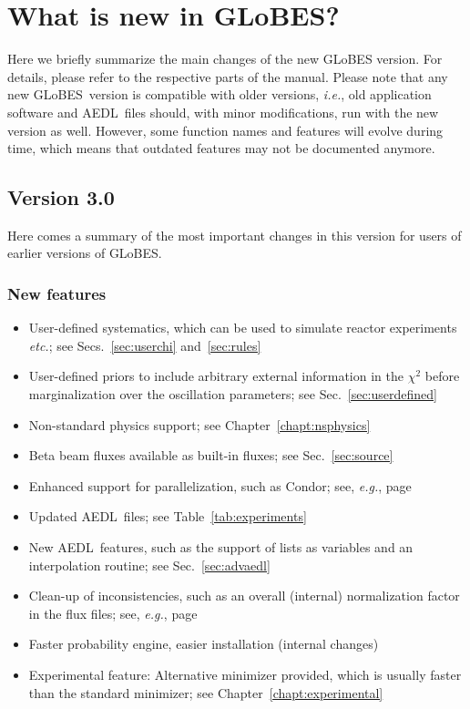 \documentclass[a4paper,12pt,twoside]{book}
\newcommand{\ie}{{\it i.e.}}
\newcommand{\eg}{{\it e.g.}}
\newcommand{\etc}{{\it etc.}}
\newcommand{\Sec}{Sec.}
\newcommand{\Secs}{Secs.}
\newcommand{\Chapt}{Chapter}
\newcommand{\Tab}{Table}
\newcommand{\GLOBES}{{\sf GLoBES}}
\newcommand{\AEDL}{{\sf AEDL}}
\begin{document}
\chapter*{What is new in \GLOBES ?}

Here we briefly summarize the main changes of the new GLoBES version. For details, please
refer to the respective parts of the manual. Please note that any new \GLOBES\ version is
compatible with older versions, \ie, old application software and \AEDL\ files should, with minor
modifications, run with the new version as well.  However, some function names and features will
evolve during time, which means that outdated features may not be documented anymore.

\section*{Version 3.0}

Here comes a summary of the most important changes in this version for users of earlier
versions of \GLOBES .

\subsection*{New features}

\begin{itemize}
 \item
  User-defined systematics, which can be used to simulate reactor experiments \etc ; see \Secs~\ref{sec:userchi}
and~\ref{sec:rules}
 \item
  User-defined priors to include arbitrary external information in the $\chi^2$ before
marginalization over the oscillation parameters; see \Sec~\ref{sec:userdefined} 
\item
  Non-standard physics support; see \Chapt~\ref{chapt:nsphysics}
\item
  Beta beam fluxes available as built-in fluxes; see \Sec~\ref{sec:source}
\item
  Enhanced support for parallelization, such as Condor; see, \eg, page~\pageref{sec:condor}
\item
  Updated \AEDL\ files; see \Tab~\ref{tab:experiments}
\item
 New \AEDL\ features, such as the support of lists as variables and an interpolation
routine; see \Sec~\ref{sec:advaedl}
\item
 Clean-up of inconsistencies, such as an overall (internal) normalization factor in the flux files;
see, \eg, page~\pageref{app:flux}
\item
  Faster probability engine, easier installation (internal changes)
\item
  Experimental feature: Alternative minimizer provided, which is usually faster than
the standard minimizer; see \Chapt~\ref{chapt:experimental}
\end{itemize}
\end{document}
